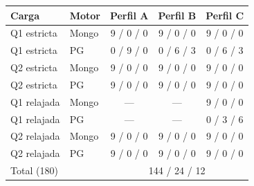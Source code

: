\begin{tabular}{@{}llccc@{}}
\toprule
Carga & Motor & Perfil A & Perfil B & Perfil C \\
\midrule
Q1 estricta & Mongo & 9 / 0 / 0 & 9 / 0 / 0 & 9 / 0 / 0 \\
Q1 estricta & PG & 0 / 9 / 0 & 0 / 6 / 3 & 0 / 6 / 3 \\
\addlinespace[2pt]
Q2 estricta & Mongo & 9 / 0 / 0 & 9 / 0 / 0 & 9 / 0 / 0 \\
Q2 estricta & PG & 9 / 0 / 0 & 9 / 0 / 0 & 9 / 0 / 0 \\
\addlinespace[2pt]
Q1 relajada & Mongo & --- & --- & 9 / 0 / 0 \\
Q1 relajada & PG & --- & --- & 0 / 3 / 6 \\
\addlinespace[2pt]
Q2 relajada & Mongo & 9 / 0 / 0 & 9 / 0 / 0 & 9 / 0 / 0 \\
Q2 relajada & PG & 9 / 0 / 0 & 9 / 0 / 0 & 9 / 0 / 0 \\
\midrule
Total (180) & & \multicolumn{3}{c}{144 / 24 / 12} \\
\bottomrule
\end{tabular}
